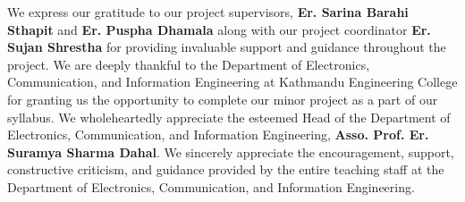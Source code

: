 We express our gratitude to our project supervisors, \textbf{Er. Sarina Barahi Sthapit} and \textbf{Er. Puspha Dhamala} along with our project coordinator\textbf{ Er. Sujan Shrestha} for providing invaluable support and guidance throughout the project. We are deeply thankful to the Department of Electronics, Communication, and Information Engineering at Kathmandu Engineering College for granting us the opportunity to complete our minor project as a part of our syllabus. We wholeheartedly appreciate the esteemed Head of the Department of Electronics, Communication, and Information Engineering, \textbf{Asso. Prof. Er. Suramya Sharma Dahal}. We sincerely appreciate the encouragement, support, constructive criticism, and guidance provided by the entire teaching staff at the Department of Electronics, Communication, and Information Engineering.